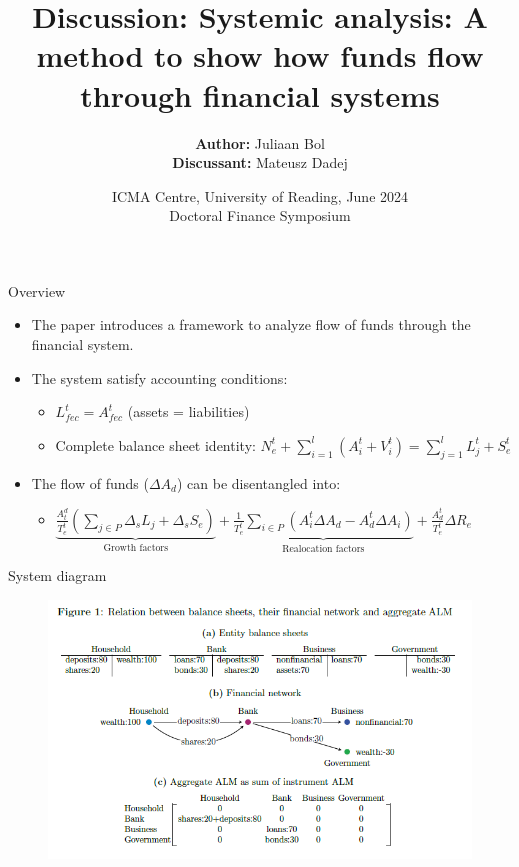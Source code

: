 \documentclass{beamer}
\title{\textbf{Discussion:} Systemic analysis: A method to show how funds flow through financial systems}
\author{\textbf{Author:} Juliaan Bol
\\
\textbf{Discussant:} Mateusz Dadej}
\date{ICMA Centre, University of Reading, June 2024
\\
Doctoral Finance Symposium}
\begin{document}
\titlepage

\begin{frame}{Overview}

\begin{itemize}
    \item<1-> The paper introduces a framework to analyze flow of funds through the financial system. 
    \item<2-> The system satisfy accounting conditions:
    \begin{itemize}
       \item<3-> $L_{fec}^t = A_{fec}^t$ (assets = liabilities)
       \item<4-> Complete balance sheet identity: $N_e^t + \sum_{i=1}^{l}(A_i^t + V_i^t) = \sum_{j=1}^{l} L_j^t + S_e^t$
    \end{itemize}    
    \item<5-> The flow of funds ($\Delta A_d$) can be disentangled into:
    \begin{itemize}
        \item<6->$\underbrace{\frac{A_t^d}{T_e^t} \left(\sum_{j \in P} \Delta_s L_j + \Delta_s S_e\right)}_{\text{Growth factors}} + \underbrace{\frac{1}{T_e^t} \sum_{i \in P}\left(A_i^t \Delta A_d - A_d^t \Delta A_i\right)}_{\text{Realocation factors}} + \frac{A_d^t}{T_e^t} \Delta R_e$
        
    \end{itemize}    
\end{itemize}    

\end{frame}    

\begin{frame}{System diagram}
    \begin{figure}[H]
        \includegraphics[scale=0.8]{diagram.png}
        \centering
    \end{figure}  
\end{frame}    
\end{document}

